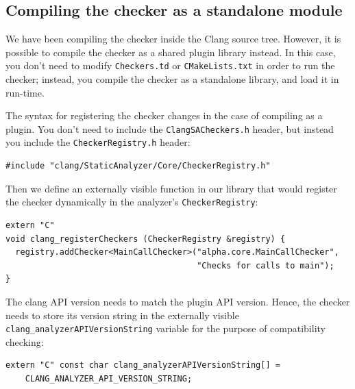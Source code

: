 \documentclass[a4paper,12pt]{article}
\newenvironment{nobr}{\begin{minipage}{\textwidth}\setlength\parskip{1em}
}{\end{minipage}\ignorespacesafterend}
\begin{document}
\begin{nobr}
\subsection{Compiling the checker as a standalone module}

We have been compiling the checker inside the Clang source tree. However, it is possible to compile the checker as a shared plugin library instead. In this case, you don't need to modify \lstinline|Checkers.td| or \lstinline|CMakeLists.txt| in order to run the checker; instead, you compile the checker as a standalone library, and load it in run-time.
\end{nobr}

\begin{nobr}
The syntax for registering the checker changes in the case of compiling as a plugin. You don't need to include the \lstinline|ClangSACheckers.h| header, but instead you include the \lstinline|CheckerRegistry.h| header:
\begin{lstlisting}[style=cplusplus,numbers=none]
#include "clang/StaticAnalyzer/Core/CheckerRegistry.h"
\end{lstlisting}
\end{nobr}

\begin{nobr}
Then we define an externally visible function in our library that would register the checker dynamically in the analyzer's \lstinline|CheckerRegistry|:

\begin{lstlisting}[style=cplusplus,numbers=none]
extern "C"
void clang_registerCheckers (CheckerRegistry &registry) {
  registry.addChecker<MainCallChecker>("alpha.core.MainCallChecker",
                                       "Checks for calls to main");
}
\end{lstlisting}
\end{nobr}

\begin{nobr}
The clang API version needs to match the plugin API version. Hence, the checker needs to store its version string in the externally visible \lstinline|clang_analyzerAPIVersionString| variable for the purpose of compatibility checking:

\begin{lstlisting}[style=cplusplus,numbers=none]
extern "C" const char clang_analyzerAPIVersionString[] =
    CLANG_ANALYZER_API_VERSION_STRING;
\end{lstlisting}
\end{nobr}
\end{document}
